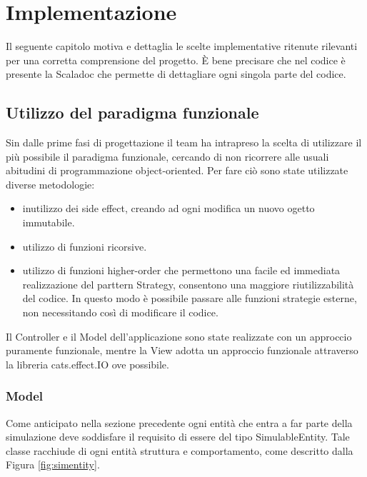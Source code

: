\chapter{Implementazione}
Il seguente capitolo motiva e dettaglia le scelte implementative ritenute rilevanti per una corretta comprensione del progetto. È bene precisare che nel codice è presente la Scaladoc che permette di dettagliare ogni singola parte del codice.

\section{Utilizzo del paradigma funzionale}
Sin dalle prime fasi di progettazione il team ha intrapreso la scelta di utilizzare il più possibile il paradigma funzionale, cercando di non ricorrere alle usuali abitudini di programmazione object-oriented. Per fare ciò sono state utilizzate diverse metodologie: 
\begin{itemize}
    \item inutilizzo dei side effect, creando ad ogni modifica un nuovo ogetto immutabile.
    \item utilizzo di funzioni ricorsive.
    \item utilizzo di funzioni higher-order che permettono una facile ed immediata realizzazione del parttern Strategy, consentono una maggiore riutilizzabilità del codice. In questo modo è possibile passare alle funzioni strategie esterne, non necessitando così di modificare il codice.
\end{itemize}

Il Controller e il Model dell'applicazione sono state realizzate con un approccio puramente funzionale, mentre la View adotta un approccio funzionale attraverso la libreria cats.effect.IO ove possibile.

\subsection{Model}

Come anticipato nella sezione precedente ogni entità che entra a far parte della simulazione deve soddisfare il requisito di essere del tipo SimulableEntity. Tale classe racchiude di ogni entità struttura e comportamento, come descritto dalla Figura \ref{fig:simentity}. 


